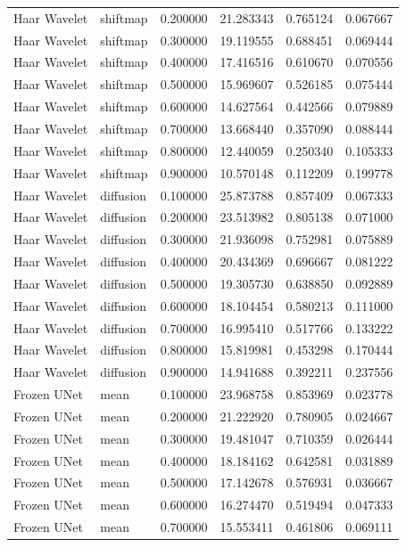 \begin{table}[h]
\begin{tabular}{llrrrr}
Haar Wavelet & shiftmap & 0.200000 & 21.283343 & 0.765124 & 0.067667 \\
Haar Wavelet & shiftmap & 0.300000 & 19.119555 & 0.688451 & 0.069444 \\
Haar Wavelet & shiftmap & 0.400000 & 17.416516 & 0.610670 & 0.070556 \\
Haar Wavelet & shiftmap & 0.500000 & 15.969607 & 0.526185 & 0.075444 \\
Haar Wavelet & shiftmap & 0.600000 & 14.627564 & 0.442566 & 0.079889 \\
Haar Wavelet & shiftmap & 0.700000 & 13.668440 & 0.357090 & 0.088444 \\
Haar Wavelet & shiftmap & 0.800000 & 12.440059 & 0.250340 & 0.105333 \\
Haar Wavelet & shiftmap & 0.900000 & 10.570148 & 0.112209 & 0.199778 \\
Haar Wavelet & diffusion & 0.100000 & 25.873788 & 0.857409 & 0.067333 \\
Haar Wavelet & diffusion & 0.200000 & 23.513982 & 0.805138 & 0.071000 \\
Haar Wavelet & diffusion & 0.300000 & 21.936098 & 0.752981 & 0.075889 \\
Haar Wavelet & diffusion & 0.400000 & 20.434369 & 0.696667 & 0.081222 \\
Haar Wavelet & diffusion & 0.500000 & 19.305730 & 0.638850 & 0.092889 \\
Haar Wavelet & diffusion & 0.600000 & 18.104454 & 0.580213 & 0.111000 \\
Haar Wavelet & diffusion & 0.700000 & 16.995410 & 0.517766 & 0.133222 \\
Haar Wavelet & diffusion & 0.800000 & 15.819981 & 0.453298 & 0.170444 \\
Haar Wavelet & diffusion & 0.900000 & 14.941688 & 0.392211 & 0.237556 \\
Frozen UNet & mean & 0.100000 & 23.968758 & 0.853969 & 0.023778 \\
Frozen UNet & mean & 0.200000 & 21.222920 & 0.780905 & 0.024667 \\
Frozen UNet & mean & 0.300000 & 19.481047 & 0.710359 & 0.026444 \\
Frozen UNet & mean & 0.400000 & 18.184162 & 0.642581 & 0.031889 \\
Frozen UNet & mean & 0.500000 & 17.142678 & 0.576931 & 0.036667 \\
Frozen UNet & mean & 0.600000 & 16.274470 & 0.519494 & 0.047333 \\
Frozen UNet & mean & 0.700000 & 15.553411 & 0.461806 & 0.069111 \\

\end{tabular}
\end{table}
